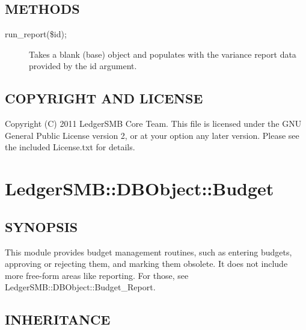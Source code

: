 \begin{description}
\subsection*{METHODS\label{LedgerSMB::DBObject::Budget_Report_METHODS}}
\begin{description}

\item[{run\_report(\$id);}] \mbox{}

Takes a blank (base) object and populates with the variance report data provided
by the id argument.

\end{description}
\subsection*{COPYRIGHT AND LICENSE\label{LedgerSMB::DBObject::Budget_Report_COPYRIGHT_AND_LICENSE}}


Copyright (C) 2011 LedgerSMB Core Team.  This file is licensed under the GNU 
General Public License version 2, or at your option any later version.  Please
see the included License.txt for details.

\section{LedgerSMB::DBObject::Budget\label{LedgerSMB::DBObject::Budget}}




\subsection*{SYNOPSIS\label{LedgerSMB::DBObject::Budget_SYNOPSIS}}


This module provides budget management routines, such as entering budgets,
approving or rejecting them, and marking them obsolete.  It does not include
more free-form areas like reporting.  For those, see
LedgerSMB::DBObject::Budget\_Report.

\subsection*{INHERITANCE\label{LedgerSMB::DBObject::Budget_INHERITANCE}}
\begin{description}


\end{description}
\end{description}
